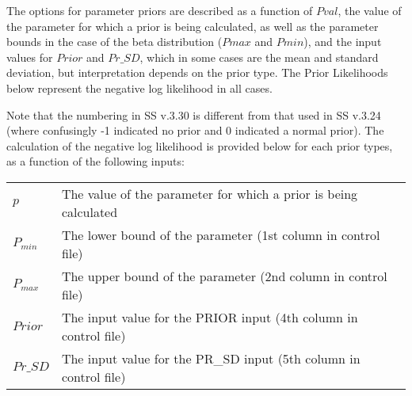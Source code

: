 The options for parameter priors are described as a function of $Pval$, the value of the parameter for which a prior is being calculated, as well as the parameter bounds in the case of the beta distribution ($Pmax$ and $Pmin$), and the input values for $Prior$ and $Pr\_SD$, which in some cases are the mean and standard deviation, but interpretation depends on the prior type. The Prior Likelihoods below represent the negative log likelihood in all cases.

Note that the numbering in SS v.3.30 is different from that used in SS v.3.24 (where confusingly -1 indicated no prior and 0 indicated a normal prior). The calculation of the negative log likelihood is provided below for each prior types, as a function of the following inputs:

\begin{tabular}{ll}
  $p$       & The value of the parameter for which a prior is being calculated  \\
  $P_{min}$  & The lower bound of the parameter (1st column in control file)     \\
  $P_{max}$  & The upper bound of the parameter (2nd column in control file)     \\
  $Prior$   & The input value for the PRIOR input (4th column in control file)  \\
  $Pr\_SD$  & The input value for the PR\_SD input (5th column in control file) \\
\end{tabular}

